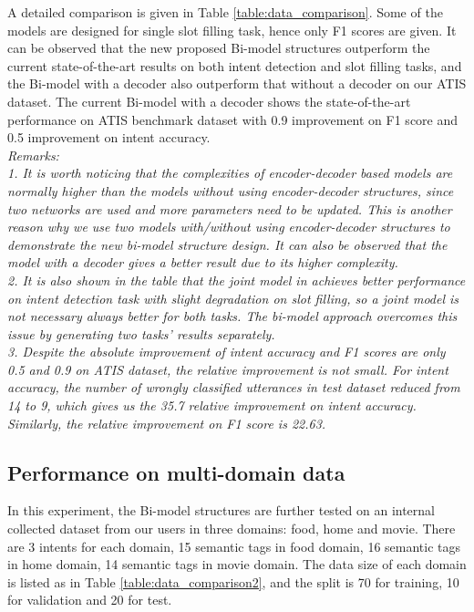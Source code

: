 \documentclass[11pt,a4paper]{article}
\begin{document}
A detailed comparison is given in Table \ref{table:data_comparison}. Some of the models are designed for single slot filling task, hence only F1 scores are given. It can be observed that the new proposed Bi-model structures outperform the current state-of-the-art results on both intent detection and slot filling tasks, and the Bi-model with a decoder also outperform that without a decoder on our ATIS dataset. The current Bi-model with a decoder shows the state-of-the-art performance on ATIS benchmark dataset with 0.9 improvement on F1 score and 0.5 improvement on intent accuracy.\\
{\it{Remarks:}\\
1.  It is worth noticing that the complexities of encoder-decoder based models are normally higher than the models without using encoder-decoder structures, since two networks are used and more parameters need to be updated. This is another reason why we use two models with/without using encoder-decoder structures to demonstrate the new bi-model structure design. It can also be observed that the model with a decoder gives a better result due to its higher complexity.\\
2. It is also shown in the table that the joint model in \cite{ liu2015recurrent, liu2016attention} achieves better performance on intent detection task with slight degradation on slot filling, so a joint model is not necessary always better for both tasks. The bi-model approach overcomes this issue by generating two tasks' results separately.\\
3. Despite the absolute improvement of intent accuracy and F1 scores are only  0.5 and 0.9 on ATIS dataset, the relative improvement is not small. For intent accuracy, the number of wrongly classified utterances in test dataset reduced from 14 to 9, which gives us the 35.7 relative improvement on intent accuracy. Similarly, the relative improvement on F1 score is 22.63.\\}



\subsection{Performance on multi-domain data}
In this experiment, the Bi-model structures are further tested on an internal collected dataset from our users in three domains: food, home and movie. There are 3 intents for each domain, 15 semantic tags in food domain, 16 semantic tags in home domain, 14 semantic tags in movie domain.  The data size of each domain is listed as in Table \ref{table:data_comparison2}, and the split is 70 for training, 10 for validation and 20 for test.
\end{document}
